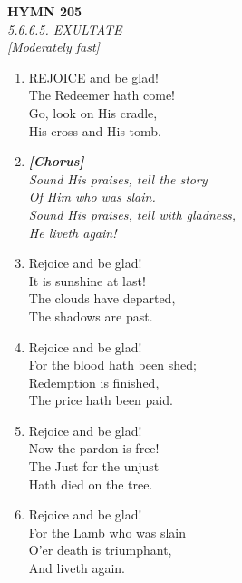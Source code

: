\documentclass[11pt,a4paper]{article}
\begin{document}
\newpage
\begin{center}
    {\Large \textbf{HYMN 205}}
    \\
    \textit{5.6.6.5. EXULTATE}
    \\
    \textit{\small [Moderately fast]}
\end{center}
\vspace{1em}

\begin{enumerate}
    \item REJOICE and be glad! \\
        The Redeemer hath come! \\
        Go, look on His cradle, \\
        His cross and His tomb.

    \item[] \vspace{0.4em}
    \textbf{\textit{[Chorus]}} \\
    \textit{Sound His praises, tell the story} \\
    \textit{    Of Him who was slain.} \\
    \textit{Sound His praises, tell with gladness,} \\
    \textit{    He liveth again!}
    \vspace{0.4em}

    \item Rejoice and be glad! \\
        It is sunshine at last! \\
        The clouds have departed, \\
        The shadows are past.

    \item Rejoice and be glad! \\
        For the blood hath been shed; \\
        Redemption is finished, \\
        The price hath been paid.

    \item Rejoice and be glad! \\
        Now the pardon is free! \\
        The Just for the unjust \\
        Hath died on the tree.

    \item Rejoice and be glad! \\
        For the Lamb who was slain \\
        O'er death is triumphant, \\
        And liveth again.


\end{enumerate}
\end{document}

